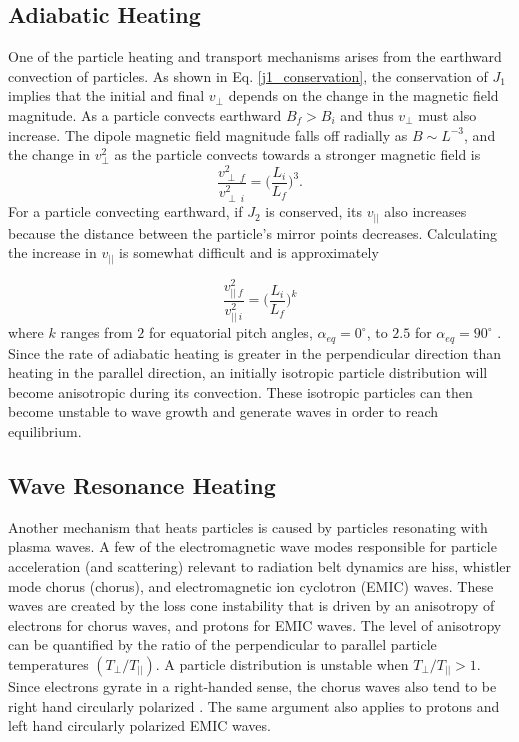 \subsection{Adiabatic Heating}\label{Intro:adiabatic_heating}
One of the particle heating and transport mechanisms arises from the earthward convection of particles. As shown in Eq. \ref{j1_conservation}, the conservation of $J_1$ implies that the initial and final $v_\perp$ depends on the change in the magnetic field magnitude. As a particle convects earthward $B_f > B_i$ and thus $v_\perp$ must also increase. The dipole magnetic field magnitude falls off radially as $B \sim L^{-3}$, and the change in $v^2_{\perp}$ as the particle convects towards a stronger magnetic field is
\begin{equation}
\frac{v_{\perp \ f}^2}{v_{\perp \ i}^2} = \bigg( \frac{L_i}{L_f} \bigg)^3.
\end{equation} For a particle convecting earthward, if $J_2$ is conserved, its $v_{||}$ also increases because the distance between the particle's mirror points decreases. Calculating the increase in $v_{||}$ is somewhat difficult and is approximately

\begin{equation}
\frac{v_{|| \ f}^2}{v_{|| \ i}^2} = \bigg( \frac{L_i}{L_f} \bigg)^k
\end{equation} where $k$ ranges from $2$ for equatorial pitch angles, $\alpha_{eq} = 0^\circ$, to $2.5$ for $\alpha_{eq} = 90^\circ$ \citep{Baumjohann1997}. Since the rate of adiabatic heating is greater in the perpendicular direction than heating in the parallel direction, an initially isotropic particle distribution will become anisotropic during its convection. These isotropic particles can then become unstable to wave growth and generate waves in order to reach equilibrium.


\subsection{Wave Resonance Heating}\label{Intro:wave_heating}
Another mechanism that heats particles is caused by particles resonating with plasma waves. A few of the electromagnetic wave modes responsible for particle acceleration (and scattering) relevant to radiation belt dynamics are hiss, whistler mode chorus (chorus), and electromagnetic ion cyclotron (EMIC) waves. These waves are created by the loss cone instability that is driven by an anisotropy of electrons for chorus waves, and protons for EMIC waves. The level of anisotropy can be quantified by the ratio of the perpendicular to parallel particle temperatures $(T_\perp/T_{||})$. A particle distribution is unstable when $T_\perp/T_{||} > 1$. Since electrons gyrate in a right-handed sense, the chorus waves also tend to be right hand circularly polarized \citep{Tsurutani1997}. The same argument also applies to protons and left hand circularly polarized EMIC waves. 

